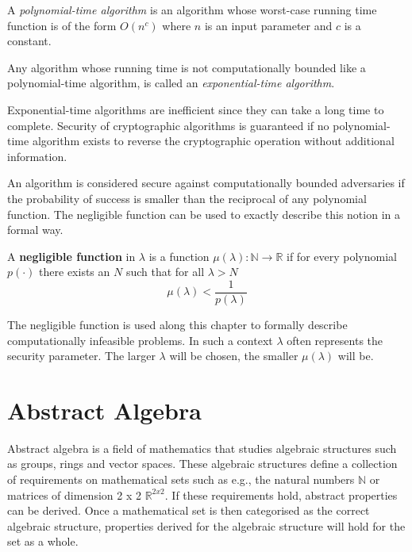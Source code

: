 \begin{defn}
\label{def:pt_algorithm}
 A \textit{polynomial-time algorithm} is an algorithm whose worst-case running time function is of the form $O \left( n^c\right)$ where $n$ is an input parameter and $c$ is a constant.
\end{defn}

\begin{defn}
\label{def:pt_algorithm}
 Any algorithm whose running time is not computationally bounded like a polynomial-time algorithm, is called an \textit{exponential-time algorithm}.
\end{defn}

Exponential-time algorithms are inefficient since they can take a long time to complete. Security of cryptographic algorithms is guaranteed if no polynomial-time algorithm exists to reverse the cryptographic operation without additional information.

An algorithm is considered secure against computationally bounded adversaries if the probability of success is smaller than the reciprocal of any polynomial function. The negligible function can be used to exactly describe this notion in a formal way.

\begin{defn}
\label{def:negligible_function}
A \textbf{negligible function} in $\lambda$ is a function $\mu \left( \lambda \right): \mathbb{N} \rightarrow \mathbb{R}$ if for every polynomial $p \left( \cdot \right)$ there exists an $N$ such that for all $\lambda > N$~\cite{book:Goldreich97}
 \begin{equation*}
  \mu \left( \lambda \right) < \frac{1}{p\left( \lambda \right)} 
 \end{equation*}
\end{defn}

The negligible function is used along this chapter to formally describe computationally infeasible problems. In such a context $\lambda$ often represents the security parameter. The larger $\lambda$ will be chosen, the smaller $\mu \left( \lambda \right)$ will be.

\section{Abstract Algebra}
Abstract algebra is a field of mathematics that studies algebraic structures such as groups, rings and vector spaces. These algebraic structures define a collection of requirements on mathematical sets such as e.g., the natural numbers $\mathbb{N}$ or matrices of dimension 2 x 2 $\mathbb{R}^{2 x 2}$. If these requirements hold, abstract properties can be derived. Once a mathematical set is then categorised as the correct algebraic structure, properties derived for the algebraic structure will hold for the set as a whole.

